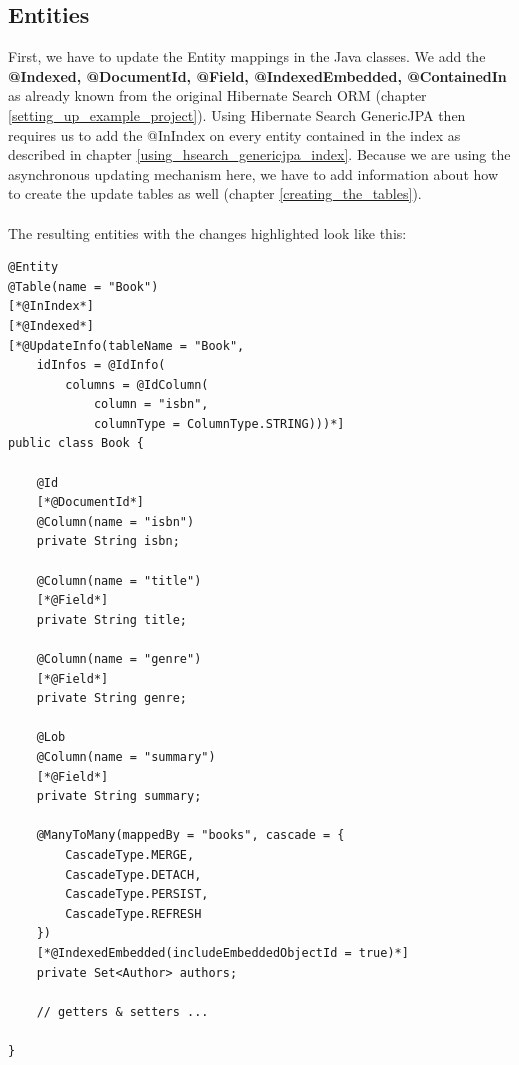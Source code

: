 \subsection{Entities}
First, we have to update the Entity mappings in the Java classes. We add the \textbf{@Indexed, @DocumentId, @Field, @IndexedEmbedded, @ContainedIn} as already known from the original Hibernate Search ORM (chapter \ref{setting_up_example_project}). Using Hibernate Search GenericJPA then requires us to add the @InIndex on every entity contained in the index as described in chapter \ref{using_hsearch_genericjpa_index}. Because we are using the asynchronous updating mechanism here, we have to add information about how to create the update tables as well (chapter \ref{creating_the_tables}).
\\\\
The resulting entities with the changes highlighted look like this:
\\
\lstset{language=java}
\begin{lstlisting}[frame=htrbl, caption={Complete Book.java}, label={lst:book.java_complete}]
@Entity
@Table(name = "Book")
[*@InIndex*]
[*@Indexed*]
[*@UpdateInfo(tableName = "Book",
	idInfos = @IdInfo(
		columns = @IdColumn(
			column = "isbn",
			columnType = ColumnType.STRING)))*]
public class Book {
	
	@Id
	[*@DocumentId*]
	@Column(name = "isbn")
	private String isbn;
	
	@Column(name = "title")
	[*@Field*]
	private String title;
	
	@Column(name = "genre")
	[*@Field*]
	private String genre;
	
	@Lob
	@Column(name = "summary")
	[*@Field*]
	private String summary;
	
	@ManyToMany(mappedBy = "books", cascade = {
		CascadeType.MERGE,
		CascadeType.DETACH,
		CascadeType.PERSIST,
		CascadeType.REFRESH
	})
	[*@IndexedEmbedded(includeEmbeddedObjectId = true)*]
	private Set<Author> authors;
	
	// getters & setters ...
	
}
\end{lstlisting}

